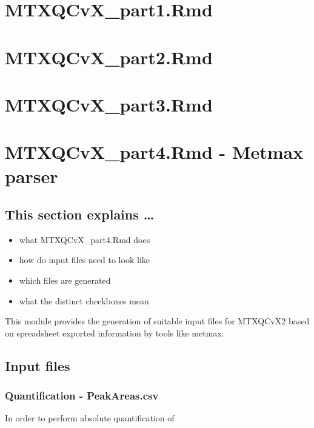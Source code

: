 \documentclass[]{book}
\providecommand{\tightlist}{%
  \setlength{\itemsep}{0pt}\setlength{\parskip}{0pt}}
\begin{document}
\chapter{MTXQCvX\_part1.Rmd}\label{part1}

\chapter{MTXQCvX\_part2.Rmd}\label{part2}

\chapter{MTXQCvX\_part3.Rmd}\label{mtxqcvx_part3.rmd}

\chapter{MTXQCvX\_part4.Rmd - Metmax
parser}\label{mtxqcvx_part4.rmd---metmax-parser}

\section{This section explains \ldots{}}\label{this-section-explains}

\begin{itemize}
\tightlist
\item
  what MTXQCvX\_part4.Rmd does
\item
  how do input files need to look like
\item
  which files are generated
\item
  what the distinct checkboxes mean
\end{itemize}

This module provides the generation of suitable input files for MTXQCvX2
based on spreadsheet exported information by tools like metmax.

\section{Input files}\label{input-files-2}

\subsection{Quantification -
PeakAreas.csv}\label{quantification---peakareas.csv}

In order to perform absolute quantification of
\end{document}
